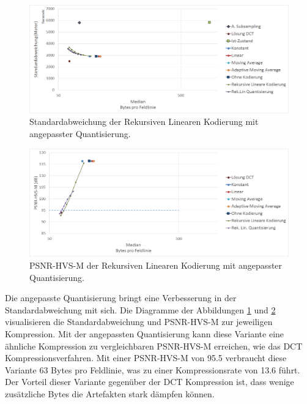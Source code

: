 \begin{figure}[!htbp]
	\center
	\includegraphics[width=1\textwidth,keepaspectratio]{./pictures/resultate/loesung2/variante3/resultate.png}
		
		\caption{Standardabweichung der Rekursiven Linearen Kodierung mit angepasster Quantisierung.}
		\label{resultate:loesung2:adaptive:median:quant}
\end{figure}
\begin{figure}[!htbp]
\center
	\includegraphics[width=1\textwidth,keepaspectratio]{./pictures/resultate/loesung2/variante3/resultate_psnr.png}
	
	\caption{PSNR-HVS-M der Rekursiven Linearen Kodierung mit angepasster Quantisierung.}
	\label{resultate:loesung2:adaptive:median:quant_psnr}
\end{figure}
Die angepasste Quantisierung bringt eine Verbesserung in der Standardabweichung mit sich. Die Diagramme der Abbildungen \ref{resultate:loesung2:adaptive:median:quant} und \ref{resultate:loesung2:adaptive:median:quant_psnr} visualisieren die Standardabweichung und PSNR-HVS-M zur jeweiligen Kompression. Mit der angepassten Quantisierung kann diese Variante eine ähnliche Kompression zu vergleichbaren PSNR-HVS-M erreichen, wie das DCT Kompressionsverfahren. Mit einer PSNR-HVS-M von 95.5 verbraucht diese Variante 63 Bytes pro Feldlinie, was zu einer Kompressionsrate von 13.6 führt. Der Vorteil dieser Variante gegenüber der DCT Kompression ist, dass wenige zusätzliche Bytes die Artefakten stark dämpfen können. 


